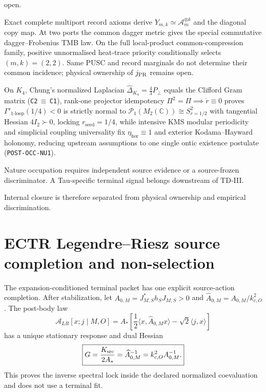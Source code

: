 \documentclass[11pt,a4paper]{article}
\theoremstyle{remark}
\begin{document}
\begin{description}
 open.
 \item[Operational record origin.] Exact complete multiport record axioms
 derive $Y_{m,k}\simeq\mathcal A_m^{\otimes k}$ and the diagonal copy map.
 At two ports the common dagger metric gives the special commutative
 dagger--Frobenius TMB law.  On the full local-product common-compression
 family, positive unnormalised heat-trace priority conditionally selects
 $(m,k)=(2,2)$.  Same PUSC and record marginals do not determine their common
 incidence; physical ownership of $j_{\rm PR}$ remains open.
 \item[Upstream postulate reduction (U1, U2, U4, F1).] On $K_4$, Chung's
 normalized Laplacian $\widehat{\Delta}_{K_4}=\frac{4}{3}P_\perp$ equals the
 Clifford Gram matrix (\texttt{C2}\,$\equiv$\,\texttt{C1}), rank-one projector
 idempotency $\Pi^2=\Pi\implies\dot{r}\equiv 0$ proves
 $\Gamma'_{1\text{-loop}}(1/4)<0$ is strictly normal to
 $\mathcal{P}_1(M_2(\mathbb{C}))\cong S^2_{r=1/2}$ with tangential Hessian
 $4I_2\succ 0$, locking $r_{\mathrm{seed}}=1/4$, while intensive KMS modular
 periodicity and simplicial coupling universality fix $\eta_{\mathrm{hor}}\equiv 1$
 and exterior Kodama--Hayward holonomy, reducing upstream assumptions to one
 single ontic existence postulate (\texttt{POST-OCC-NU1}).
 \item[Open.] Nature occupation requires independent source evidence or a
 source-frozen discriminator.  A Tau-specific terminal signal belongs
 downstream of TD-III.
\end{description}
Internal closure is therefore separated from physical ownership and empirical
discrimination.

\section{ECTR Legendre--Riesz source completion and non-selection}

The expansion-conditioned terminal packet has one explicit source-action
completion. After stabilization, let
$A_{0,M}=J_{M,S}^*h_SJ_{M,S}>0$ and
$\widehat A_{0,M}=A_{0,M}/k_{c,O}^2$. The post-body law
\begin{equation}
 \mathcal A_{LR}[x;j\mid M,O]
 =A_*\left[\frac{1}{2}\langle x,\widehat A_{0,M}x\rangle
 -\sqrt2\langle j,x\rangle\right]
 \label{eq:td0-ectr-lr}
\end{equation}
has a unique stationary response and dual Hessian
\begin{equation}
 \boxed{G=\frac{K_{\rm src}}{2A_*}
 =\widehat A_{0,M}^{-1}=k_{c,O}^2A_{0,M}^{-1}.}
 \label{eq:td0-ectr-dual-lock}
\end{equation}
This proves the inverse spectral lock inside the declared normalized
coevaluation and does not use a terminal fit.
\end{document}

